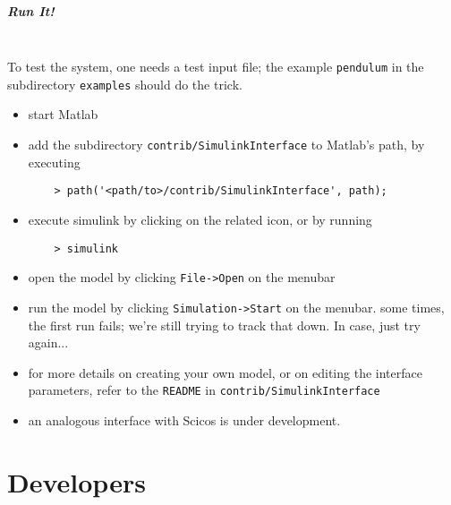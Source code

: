 \documentclass[10pt,dvips]{report}
\newcommand{\kw}[1]{\texttt{#1}}
\begin{document}
\paragraph{Run It!} \mbox{} \\
To test the system, one needs a test input file; the example 
\kw{pendulum} in the subdirectory \kw{examples} 
should do the trick.
\begin{itemize}
\item start Matlab
\item add the subdirectory \kw{contrib/SimulinkInterface} to Matlab's 
path, by executing
\begin{verbatim}
    > path('<path/to>/contrib/SimulinkInterface', path);
\end{verbatim}
\item execute simulink by clicking on the related icon, or by running
\begin{verbatim}
    > simulink
\end{verbatim}
\item open the model by clicking \kw{File->Open} on the menubar
\item run the model by clicking \kw{Simulation->Start} on the menubar.
some times, the first run fails; we're still trying to track that down.
In case, just try again...
\item for more details on creating your own model, or on editing
the interface parameters, refer to the \kw{README} 
in \kw{contrib/SimulinkInterface}
\item an analogous interface with Scicos is under development.
\end{itemize}




\chapter{Developers}



\end{document}
